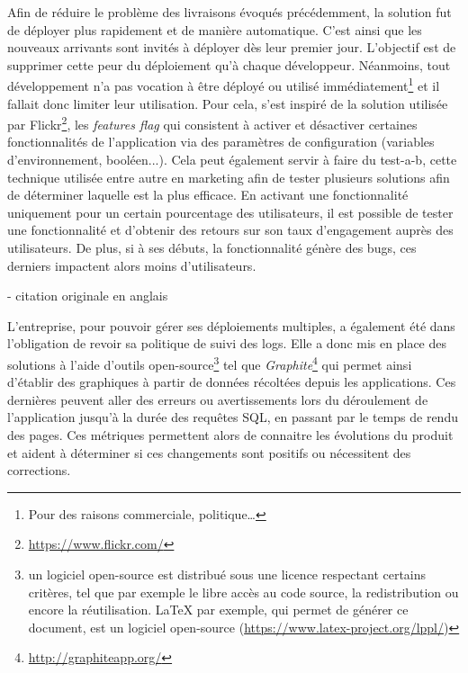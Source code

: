 Afin de réduire le problème des livraisons évoqués précédemment, la solution fut de déployer plus rapidement et de manière automatique. C'est ainsi que les nouveaux arrivants sont invités à déployer dès leur premier jour. L'objectif est de supprimer cette peur du déploiement qu'à chaque développeur. Néanmoins, tout développement n'a pas vocation à être déployé ou utilisé immédiatement\footnote{Pour des raisons commerciale, politique\ldots} et il fallait donc limiter leur utilisation. Pour cela, \etsy{} s'est inspiré de la solution utilisée par Flickr\footnote{\url{https://www.flickr.com/}}, les \emph{features flag} qui consistent à activer et désactiver certaines fonctionnalités de l'application via des paramètres de configuration (variables d'environnement, booléen...). Cela peut également servir à faire du \gls{test-a-b}, cette technique utilisée entre autre en marketing afin de tester plusieurs solutions afin de déterminer laquelle est la plus efficace. En activant une fonctionnalité uniquement pour un certain pourcentage des utilisateurs, il est possible de tester une fonctionnalité et d'obtenir des retours sur son taux d'engagement auprès des utilisateurs. De plus, si à ses débuts, la fonctionnalité génère des bugs, ces derniers impactent alors moins d'utilisateurs.

\epigraph{}{ \cite{etsyLogs} - citation originale en anglais}

L'entreprise, pour pouvoir gérer ses déploiements multiples, a également été dans l'obligation de revoir sa politique de suivi des logs. Elle a donc mis en place des solutions à l'aide d'outils open-source\footnote{un logiciel open-source est distribué sous une licence respectant certains critères, tel que par exemple le libre accès au code source, la redistribution ou encore la réutilisation. \LaTeX{} par exemple, qui permet de générer ce document, est un logiciel open-source (\url{https://www.latex-project.org/lppl/})} tel que \emph{Graphite}\footnote{\url{http://graphiteapp.org/}} qui permet ainsi d'établir des graphiques à partir de données récoltées depuis les applications. Ces dernières peuvent aller des erreurs ou avertissements lors du déroulement de l'application jusqu'à la durée des requêtes \gls{SQL}, en passant par le temps de rendu des pages. Ces métriques permettent alors de connaitre les évolutions du produit et aident à déterminer si ces changements sont positifs ou nécessitent des corrections.

